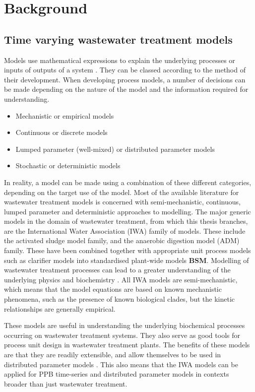 \section{Background}
\label{sec:chap1-background}
\subsection{Time varying wastewater treatment models}
\label{ssec:chap1-wwtmod}
Models use mathematical expressions to explain the underlying processes or inputs of outputs of a system \cite{Hangos2001}. They can be classed according to the method of their development. When developing process models, a number of decisions can be made depending on the nature of the model and the information required for understanding.
\begin{itemize}
    \item Mechanistic or empirical models
    \item Continuous or discrete models
    \item Lumped parameter (well-mixed) or distributed parameter models
    \item Stochastic or deterministic models
\end{itemize}

In reality, a model can be made using a combination of these different categories, depending on the target use of the model. Most of the available literature for wastewater treatment models is concerned with semi-mechanistic, continuous, lumped parameter and deterministic approaches to modelling. The major generic models in the domain of wastewater treatment, from which this thesis branches, are the International Water Association (IWA) family of models. These include the activated sludge model family, and the anaerobic digestion model (ADM) \cite{Batstone2006} family. These have been combined together with appropriate unit process models such as clarifier models \cite{Takacs1991} into standardised plant-wide models \textbf{BSM}. Modelling of wastewater treatment processes can lead to a greater understanding of the underlying physics and biochemistry \cite{Szilvester2010}. All IWA models are semi-mechanistic, which means that the model equations are based on known mechanistic phenomena, such as the presence of known biological clades, but the kinetic relationships are generally empirical. 

These models are useful in understanding the underlying biochemical processes occurring on wastewater treatment systems. They also serve as good tools for process unit design in wastewater treatment plants. The benefits of these models are that they are readily extensible, and allow themselves to be used in distributed parameter models \cite{Batstone2006a}. This also means that the IWA models can be applied for PPB time-series and distributed parameter models in contexts broader than just wastewater treatment. 

